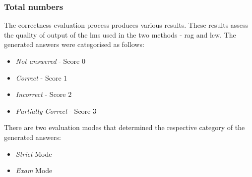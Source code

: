 \subsubsection{Total numbers}
The correctness evaluation process produces various results.
These results assess the quality of output of the \acp{lm} used in the two methods - \ac{rag} and \ac{lcw}.
The generated answers were categorised as follows:
\begin{itemize}
    \item \textit{\textcolor{red!80!black}{Not answered}} - Score \textbf{$0$}
    \item \textit{\textcolor{green!60!black}{Correct}} - Score \textbf{$1$}
    \item \textit{\textcolor{orange!80!black}{Incorrect}} - Score \textbf{$2$}
    \item \textit{\textcolor{cyan!80!black}{Partially Correct}} - Score \textbf{$3$}
\end{itemize}
There are two evaluation modes that determined the respective category of the generated answers: 
\begin{itemize}
    \item \textit{Strict} Mode
    \item \textit{Exam} Mode
\end{itemize}

